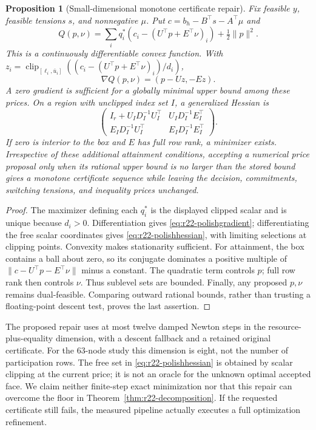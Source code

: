 \documentclass[11pt,letterpaper]{article}
\newtheorem{proposition}[theorem]{Proposition}
\theoremstyle{definition}
\newcommand{\1}{\mathbf 1}
\begin{document}
\begin{proposition}[Small-dimensional monotone certificate repair]\label{prop:r22-polishing}
Fix feasible $y$, feasible tensions $s$, and nonnegative $\mu$. Put $c=b_h-B^\top s-A^\top\mu$ and
\[
 Q(p,\nu)=\sum_iq_i^*(c_i-(U^\top p+E^\top\nu)_i)+\tfrac12\|p\|^2.
\]
This is a continuously differentiable convex function. With
$z_i=\operatorname{clip}_{[\ell_i,\bar u_i]}((c_i-(U^\top p+E^\top\nu)_i)/d_i)$,
\begin{equation}\label{eq:r22-polishgradient}
 \nabla Q(p,\nu)=(p-Uz,-Ez).
\end{equation}
A zero gradient is sufficient for a globally minimal upper bound among these prices. On a region with unclipped index set $I$, a generalized Hessian is
\begin{equation}\label{eq:r22-polishhessian}
 \begin{pmatrix}
 I_r+U_ID_I^{-1}U_I^\top&U_ID_I^{-1}E_I^\top\\
 E_ID_I^{-1}U_I^\top&E_ID_I^{-1}E_I^\top
 \end{pmatrix}.
\end{equation}
If zero is interior to the box and $E$ has full row rank, a minimizer exists. Irrespective of these additional attainment conditions, accepting a numerical price proposal only when its rational upper bound is no larger than the stored bound gives a monotone certificate sequence while leaving the decision, commitments, switching tensions, and inequality prices unchanged.
\end{proposition}
\begin{proof}
The maximizer defining each $q_i^*$ is the displayed clipped scalar and is unique because $d_i>0$. Differentiation gives \eqref{eq:r22-polishgradient}; differentiating the free scalar coordinates gives \eqref{eq:r22-polishhessian}, with limiting selections at clipping points. Convexity makes stationarity sufficient. For attainment, the box contains a ball about zero, so its conjugate dominates a positive multiple of $\|c-U^\top p-E^\top\nu\|$ minus a constant. The quadratic term controls $p$; full row rank then controls $\nu$. Thus sublevel sets are bounded. Finally, any proposed $p,\nu$ remains dual-feasible. Comparing outward rational bounds, rather than trusting a floating-point descent test, proves the last assertion.
\end{proof}
The proposed repair uses at most twelve damped Newton steps in the resource-plus-equality dimension, with a descent fallback and a retained original certificate. For the 63-node study this dimension is eight, not the number of participation rows. The free set in \eqref{eq:r22-polishhessian} is obtained by scalar clipping at the current price; it is not an oracle for the unknown optimal accepted face. We claim neither finite-step exact minimization nor that this repair can overcome the floor in Theorem~\ref{thm:r22-decomposition}. If the requested certificate still fails, the measured pipeline actually executes a full optimization refinement.
\end{document}
